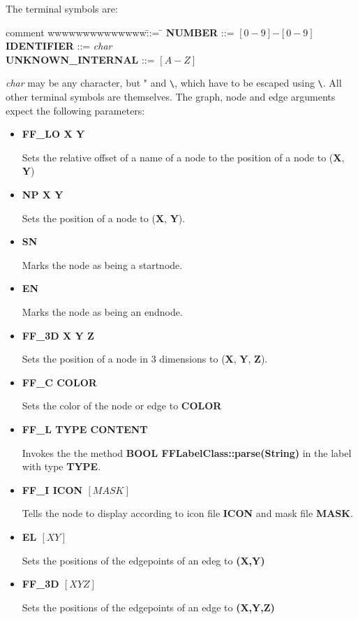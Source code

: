 The terminal symbols are:

\bigskip

\begin{tabbing}
comment wwwwwwwwwwwwww\= ::= \=\kill
{\bf NUMBER} \> ::= \> $[0-9]$\bnfplus \bnfchoice $-[0-9]$\bnfplus \\
{\bf IDENTIFIER} \> ::= \>  {\em char\/} \bnfstar {} \\
{\bf UNKNOWN\_INTERNAL} \> ::= \> $[A-Z]$\bnfplus \\
\end{tabbing}

{\em char\/} may be any character, but " and \verb|\|, which have
to be escaped using \verb|\|.
All other terminal symbols are themselves. The graph, node and edge 
arguments expect the following parameters:

\begin{itemize}

\item{\bf FF\_LO X Y}
  
  Sets the relative offset of a name of a node to the position of
  a node to ({\bf X}, {\bf Y})

\item{\bf NP X Y}

Sets the position of a node to ({\bf X}, {\bf Y}).

\item{\bf SN}

Marks the node as being a startnode.

\item{\bf EN}

Marks the node as being an endnode.

\item{\bf FF\_3D X Y Z}
  
  Sets the position of a node in 3 dimensions to ({\bf X}, {\bf
    Y}, {\bf Z}).

\item{\bf FF\_C COLOR}

Sets the color of the node or edge to {\bf COLOR}

\item{\bf FF\_L TYPE CONTENT}
  
  Invokes the the method {\bf BOOL FFLabelClass::parse(String)} in the
  label with type {\bf TYPE}.

\item{\bf FF\_I ICON $[MASK]$}
  
  Tells the node to display according to icon file {\bf ICON} and
  mask file {\bf MASK}.

\item{\bf EL $[X Y]$\bnfplus}
  
  Sets the positions of the edgepoints of an edeg to {\bf
    (X,Y)\bnfplus}

\item{\bf FF\_3D $[X Y Z]$\bnfplus}
  
  Sets the positions of the edgepoints of an edge to {\bf
    (X,Y,Z)\bnfplus}

\end{itemize}


\newpage
